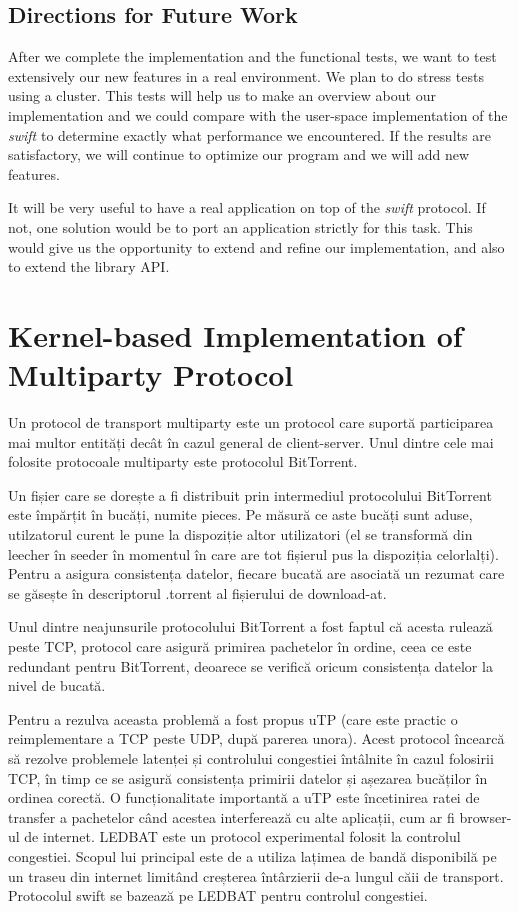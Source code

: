 \subsection{Directions for Future Work}

After we complete the implementation and the functional tests, we want to test
extensively our new features in a real environment. We plan to do stress tests
using a cluster. This tests will help us to make an overview about our
implementation and we could compare with the user-space implementation of the
\textit{swift} to determine exactly what performance we encountered. If the
results are satisfactory, we will continue to optimize our program and we will
add new features.

It will be very useful to have a real application on top of the \textit{swift}
protocol. If not, one solution would be to port an application strictly for
this task. This would give us the opportunity to extend and refine our
implementation, and also to extend the library API.

\section{Kernel-based Implementation of Multiparty Protocol}

Un protocol de transport multiparty este un protocol care suportă participarea
mai multor entități decât în cazul general de client-server.  Unul dintre cele
mai folosite protocoale multiparty este protocolul BitTorrent.

Un fișier care se dorește a fi distribuit prin intermediul protocolului
BitTorrent este împărțit în bucăți, numite pieces. Pe măsură ce aste bucăți
sunt aduse, utilzatorul curent le pune la dispoziție altor utilizatori (el se
transformă din leecher în seeder în momentul în care are tot fișierul pus la
dispoziția celorlalți). Pentru a asigura consistența datelor, fiecare bucată
are asociată un rezumat care se găsește în descriptorul .torrent al
fișierului de download-at.

Unul dintre neajunsurile protocolului BitTorrent a fost faptul că
acesta rulează peste TCP, protocol care asigură primirea pachetelor în
ordine, ceea ce este redundant pentru BitTorrent, deoarece se verifică
oricum consistența datelor la nivel de bucată.

Pentru a rezulva aceasta problemă a fost propus uTP (care este
practic o reimplementare a TCP peste UDP, după parerea unora). Acest
protocol încearcă să rezolve problemele latenței și controlului congestiei
întâlnite în cazul folosirii TCP, în timp ce se asigură consistența primirii
datelor și așezarea bucăților în ordinea corectă. O funcționalitate
importantă a uTP este încetinirea ratei de transfer a pachetelor când
acestea interferează cu alte aplicații, cum ar fi browser-ul de internet.
LEDBAT este un protocol experimental folosit la controlul
congestiei. Scopul lui principal este de a utiliza lațimea de bandă
disponibilă pe un traseu din internet limitând creșterea întârzierii de-a
lungul căii de transport. Protocolul swift se bazează pe LEDBAT pentru
controlul congestiei.

